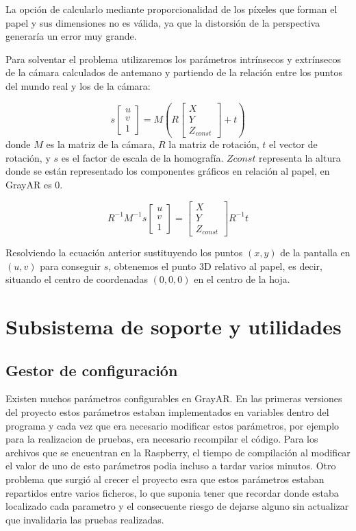 La opción de calcularlo mediante proporcionalidad de los píxeles que
forman el papel y sus dimensiones no es válida, ya que la distorsión
de la perspectiva generaría un error muy grande.

Para solventar el problema utilizaremos los parámetros intrínsecos y
extrínsecos de la cámara calculados de antemano y partiendo de la
relación entre los puntos del mundo real y los de la cámara:

\begin{equation}
s \begin{bmatrix}
u\\
v\\
1
\end{bmatrix} = M(R\begin{bmatrix}
X\\
Y\\
Z_{const}
\end{bmatrix}+t)
\end{equation}
donde $M$ es la matriz de la cámara, $R$ la matriz de rotación, $t$ el
vector de rotación, y $s$ es el factor de escala de la homografía. $Zconst$ representa la altura
donde se están representado los componentes gráficos en relación al papel, en GrayAR es 0.

\begin{equation}
R^{-1} M^{-1} s \begin{bmatrix}
u\\
v\\
1
\end{bmatrix} = \begin{bmatrix}
X\\
Y\\
Z_{const}
\end{bmatrix} R^{-1}t
\end{equation}

Resolviendo la ecuación anterior sustituyendo los puntos $(x,y)$ de la
pantalla en $(u,v)$ para conseguir $s$, obtenemos el punto 3D relativo
al papel, es decir, situando el centro de coordenadas $(0,0,0)$ en el
centro de la hoja.



\section{Subsistema de soporte y utilidades}
\subsection{Gestor de configuración}
Existen muchos parámetros configurables en GrayAR. En las primeras versiones del proyecto estos parámetros estaban implementados en variables dentro del programa y cada vez que era necesario modificar estos parámetros, por ejemplo para la realizacion de pruebas, era necesario recompilar el código. Para los archivos que se encuentran en la Raspberry, el tiempo de compilación al modificar el valor de uno de esto parámetros podia incluso a tardar varios minutos. Otro problema que surgió al crecer el proyecto esra que estos parámetros estaban repartidos entre varios ficheros, lo que suponia tener que recordar donde estaba localizado cada parametro y el consecuente riesgo de dejarse alguno sin actualizar que invalidaria las pruebas realizadas.

